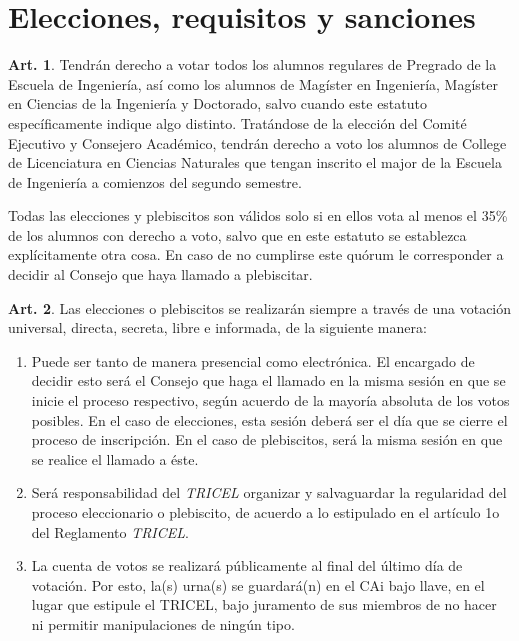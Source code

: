 \documentclass[letterpaper,11pt]{article}
\theoremstyle{definition}%
\newtheorem{art}{Art.} %
\begin{document}
\section{Elecciones, requisitos y sanciones}\label{elecciones}

\begin{art}\label{porcentajeMinimo}
	Tendrán derecho a votar todos los alumnos regulares de Pregrado de la Escuela de Ingeniería, así como los alumnos de Magíster en Ingeniería, Magíster en Ciencias de la Ingeniería y Doctorado, salvo cuando este estatuto específicamente indique algo distinto. Tratándose de la elección del Comité Ejecutivo y Consejero Académico, tendrán derecho a voto los alumnos de College de Licenciatura en Ciencias Naturales que tengan inscrito el major de la Escuela de Ingeniería a comienzos del segundo semestre.

	Todas las elecciones y plebiscitos son válidos solo si en ellos vota al menos el 35\% de los alumnos con derecho a voto, salvo que en este estatuto se establezca explícitamente otra cosa. En caso de no cumplirse este quórum le corresponder a decidir al Consejo que haya llamado a plebiscitar.
\end{art}

\begin{art}\label{definicionEleccionesYPlebiscitos}
	Las elecciones o plebiscitos se realizarán siempre a través de una votación universal, directa, secreta, libre e informada, de la siguiente manera:
	\begin{enumerate}
		\item Puede ser tanto de manera presencial como electrónica. El encargado de decidir esto será el Consejo que haga el llamado en la misma sesión en que se inicie el proceso respectivo, según acuerdo de la mayoría absoluta de los votos posibles. En el caso de elecciones, esta sesión deberá ser el día que se cierre el proceso de inscripción. En el caso de plebiscitos, será la misma sesión en que se realice el llamado a éste.
		\item Será responsabilidad del \emph{TRICEL} organizar y salvaguardar la regularidad del proceso eleccionario o plebiscito, de acuerdo a lo estipulado en el artículo 1o del Reglamento \emph{TRICEL}.
		\item La cuenta de votos se realizará públicamente al final del último día de votación. Por esto, la(s) urna(s) se guardará(n) en el CAi bajo llave, en el lugar que estipule el TRICEL, bajo juramento de sus miembros de no hacer ni permitir manipulaciones de ningún tipo.
	\end{enumerate}
\end{art}
\end{document}
